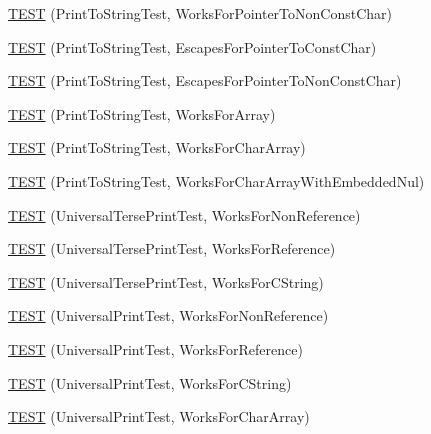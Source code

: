 \begin{DoxyCompactItemize}
\item 
\hyperlink{namespacetesting_1_1gtest__printers__test_a1db34d8760c17157572ce2877007d15a}{T\+E\+ST} (Print\+To\+String\+Test, Works\+For\+Pointer\+To\+Non\+Const\+Char)
\item 
\hyperlink{namespacetesting_1_1gtest__printers__test_ab8fce4287e837cfcd851ded56b62f9ce}{T\+E\+ST} (Print\+To\+String\+Test, Escapes\+For\+Pointer\+To\+Const\+Char)
\item 
\hyperlink{namespacetesting_1_1gtest__printers__test_a7203081ef422f0835643d2c54b8ebf28}{T\+E\+ST} (Print\+To\+String\+Test, Escapes\+For\+Pointer\+To\+Non\+Const\+Char)
\item 
\hyperlink{namespacetesting_1_1gtest__printers__test_a78bd89af8a8505880b78ec2a001d3cb8}{T\+E\+ST} (Print\+To\+String\+Test, Works\+For\+Array)
\item 
\hyperlink{namespacetesting_1_1gtest__printers__test_ad122dc21e7ebad023d7048ef117a1129}{T\+E\+ST} (Print\+To\+String\+Test, Works\+For\+Char\+Array)
\item 
\hyperlink{namespacetesting_1_1gtest__printers__test_a65e208358dddc7747f4519410c71d877}{T\+E\+ST} (Print\+To\+String\+Test, Works\+For\+Char\+Array\+With\+Embedded\+Nul)
\item 
\hyperlink{namespacetesting_1_1gtest__printers__test_ab49ff6527b0b01411b725fe46e1af65c}{T\+E\+ST} (Universal\+Terse\+Print\+Test, Works\+For\+Non\+Reference)
\item 
\hyperlink{namespacetesting_1_1gtest__printers__test_ab7adb58a0e08e0830157a5a1c7bceac5}{T\+E\+ST} (Universal\+Terse\+Print\+Test, Works\+For\+Reference)
\item 
\hyperlink{namespacetesting_1_1gtest__printers__test_ab11252e228a240a349d747546bc222d2}{T\+E\+ST} (Universal\+Terse\+Print\+Test, Works\+For\+C\+String)
\item 
\hyperlink{namespacetesting_1_1gtest__printers__test_a43d4efc91c2ea7d8220891df9b0437df}{T\+E\+ST} (Universal\+Print\+Test, Works\+For\+Non\+Reference)
\item 
\hyperlink{namespacetesting_1_1gtest__printers__test_a58ad7c81884e852b09646764ce14a47e}{T\+E\+ST} (Universal\+Print\+Test, Works\+For\+Reference)
\item 
\hyperlink{namespacetesting_1_1gtest__printers__test_ac20aca012aca1ca9589dbf7483fbbbd1}{T\+E\+ST} (Universal\+Print\+Test, Works\+For\+C\+String)
\item 
\hyperlink{namespacetesting_1_1gtest__printers__test_a23a9eda97679bfc29c87b8de17cc35bf}{T\+E\+ST} (Universal\+Print\+Test, Works\+For\+Char\+Array)
\end{DoxyCompactItemize}


